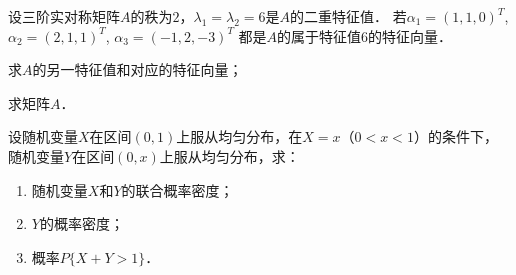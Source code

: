 \documentclass[plain,noanswer,medmath]{../../template/jnuexam}
\begin{document}
\begin{problem}[points=13]
设三阶实对称矩阵$A$的秩为$2$，$\lambda_1 = \lambda_2 = 6$是$A$的二重特征值．
若$\alpha_1 = (1,1,0)^T$, $\alpha_2 = (2,1,1)^T$, $\alpha_3 = (- 1,2, - 3)^T$
都是$A$的属于特征值$6$的特征向量．\par
\begin{enumerate*}
\item 求$A$的另一特征值和对应的特征向量；
\item 求矩阵$A$．
\end{enumerate*}
\end{problem}




\begin{problem}[points=13]
设随机变量$X$在区间$(0,1)$上服从均匀分布，在$X = x$（$0 < x < 1$）的条件下，
随机变量$Y$在区间$(0,x)$上服从均匀分布，求：
\begin{enumerate}
\item 随机变量$X$和$Y$的联合概率密度；
\item $Y$的概率密度；
\item 概率$P\{X + Y > 1\}$．
\end{enumerate}
\end{problem}
\end{document}
